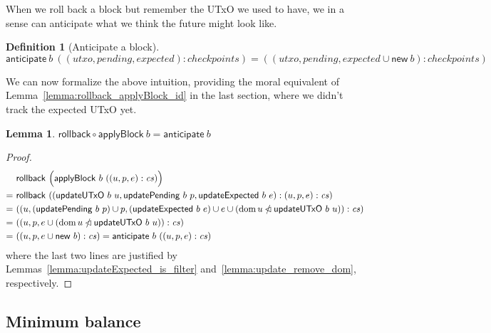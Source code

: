 \documentclass{article}
\DeclareMathOperator{\dom}{dom}
\newcommand{\restrictdom}{\lhd}
\newcommand{\subtractdom}{\mathbin{\slashed{\restrictdom}}}
\newtheorem{lemma}{Lemma}
\newtheorem{definition}{Definition}
\begin{document}
When we roll back a block but remember the UTxO we used to have, we in a sense
can anticipate what we think the future might look like.

\begin{definition}[Anticipate a block]
\begin{equation*}
  \mathsf{anticipate} ~ b ~ ((\mathit{utxo}, \mathit{pending}, \mathit{expected}) : \mathit{checkpoints})
= ((\mathit{utxo}, \mathit{pending}, \mathit{expected} \cup \mathsf{new} ~ b) : \mathit{checkpoints})
\end{equation*}
\end{definition}

We can now formalize the above intuition, providing the moral equivalent
of Lemma~\ref{lemma:rollback_applyBlock_id} in the last section, where we didn't
track the expected UTxO yet.

\begin{lemma}
\begin{math}
  \mathsf{rollback} \circ \mathsf{applyBlock} ~ b = \mathsf{anticipate} ~ b
\end{math}
\end{lemma}

\begin{proof}
\begin{align*}
  & ~ \mathsf{rollback} ~ \Bigl( \mathsf{applyBlock} ~ b ~ ((u, p, e) : \mathit{cs}) \Bigr) \\
= & ~ \mathsf{rollback} ~ ((\mathsf{updateUTxO} ~ b ~ u, \mathsf{updatePending} ~ b ~ p, \mathsf{updateExpected} ~ b ~ e) : (u, p, e) : \mathit{cs}) \\
= & ~ ((u, (\mathsf{updatePending} ~ b ~ p) \cup p,  (\mathsf{updateExpected} ~ b ~ e) \cup e \cup (\dom u \subtractdom \mathsf{updateUTxO} ~ b ~ u)) : \mathit{cs}) \\
= & ~ ((u, p, e \cup (\dom u \subtractdom \mathsf{updateUTxO} ~ b ~ u)) : \mathit{cs}) \\
= & ~ ((u, p, e \cup \mathsf{new} ~ b) : \mathit{cs}) = \mathsf{anticipate} ~ b ~ ((u, p, e) : \mathit{cs}) \\
\end{align*}
where the last two lines are justified by Lemmas~\ref{lemma:updateExpected_is_filter}
and~\ref{lemma:update_remove_dom}, respectively.
\end{proof}

\subsection{Minimum balance}
\end{document}
